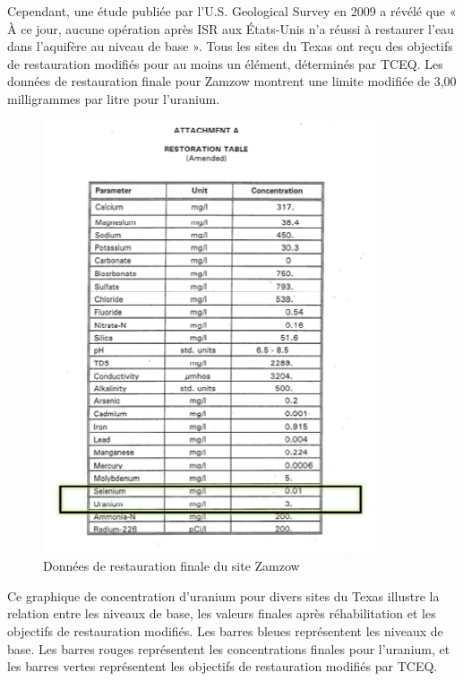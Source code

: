 \documentclass{article}
\begin{document}
Cependant, une étude publiée par l'U.S. Geological Survey en 2009 a révélé que « À ce jour, aucune opération après ISR aux États-Unis n'a réussi à restaurer l'eau dans l'aquifère au niveau de base ». Tous les sites du Texas ont reçu des objectifs de restauration modifiés pour au moins un élément, déterminés par TCEQ. Les données de restauration finale pour Zamzow montrent une limite modifiée de 3,00 milligrammes par litre pour l'uranium. 


\begin{figure}[H]
    \centering
    \includegraphics[width=0.7\linewidth]{II_C_3.png}
    \caption{Données de restauration finale du site Zamzow}
    \label{fig:restauration_finale_zamzow}
\end{figure}


Ce graphique de concentration d'uranium pour divers sites du Texas illustre la relation entre les niveaux de base, les valeurs finales après réhabilitation et les objectifs de restauration modifiés. Les barres bleues représentent les niveaux de base. Les barres rouges représentent les concentrations finales pour l'uranium, et les barres vertes représentent les objectifs de restauration modifiés par TCEQ.

\end{document}
